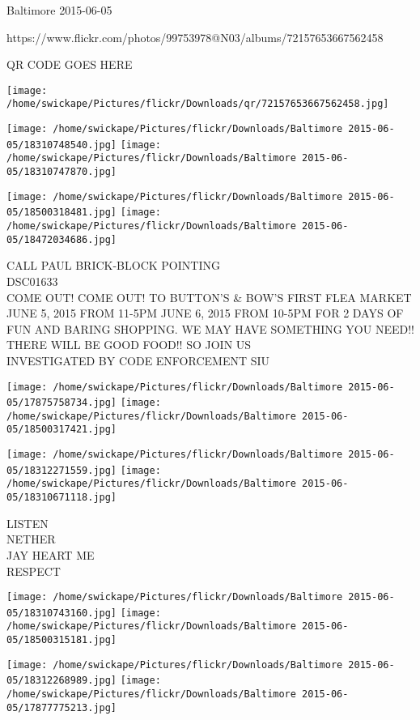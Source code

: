 \documentclass[10pt,letterpaper]{article}
\begin{document}
Baltimore 2015-06-05

https://www.flickr.com/photos/99753978@N03/albums/72157653667562458

QR CODE GOES HERE

\texttt{[image: /home/swickape/Pictures/flickr/Downloads/qr/72157653667562458.jpg]}
\pagebreak

\texttt{[image: /home/swickape/Pictures/flickr/Downloads/Baltimore 2015-06-05/18310748540.jpg]}
\texttt{[image: /home/swickape/Pictures/flickr/Downloads/Baltimore 2015-06-05/18310747870.jpg]}

\texttt{[image: /home/swickape/Pictures/flickr/Downloads/Baltimore 2015-06-05/18500318481.jpg]}
\texttt{[image: /home/swickape/Pictures/flickr/Downloads/Baltimore 2015-06-05/18472034686.jpg]}

CALL PAUL BRICK{-}BLOCK POINTING\\
DSC01633\\
COME OUT!  COME OUT!  TO BUTTON'S \& BOW'S FIRST FLEA MARKET JUNE 5, 2015 FROM 11{-}5PM JUNE 6, 2015 FROM 10{-}5PM FOR 2 DAYS OF FUN AND BARING SHOPPING.  WE MAY HAVE SOMETHING YOU NEED!! THERE WILL BE GOOD FOOD!! SO JOIN US\\
INVESTIGATED BY CODE ENFORCEMENT SIU\\
\pagebreak

\texttt{[image: /home/swickape/Pictures/flickr/Downloads/Baltimore 2015-06-05/17875758734.jpg]}
\texttt{[image: /home/swickape/Pictures/flickr/Downloads/Baltimore 2015-06-05/18500317421.jpg]}

\texttt{[image: /home/swickape/Pictures/flickr/Downloads/Baltimore 2015-06-05/18312271559.jpg]}
\texttt{[image: /home/swickape/Pictures/flickr/Downloads/Baltimore 2015-06-05/18310671118.jpg]}

LISTEN\\
NETHER\\
JAY HEART ME\\
RESPECT\\
\pagebreak

\texttt{[image: /home/swickape/Pictures/flickr/Downloads/Baltimore 2015-06-05/18310743160.jpg]}
\texttt{[image: /home/swickape/Pictures/flickr/Downloads/Baltimore 2015-06-05/18500315181.jpg]}

\texttt{[image: /home/swickape/Pictures/flickr/Downloads/Baltimore 2015-06-05/18312268989.jpg]}
\texttt{[image: /home/swickape/Pictures/flickr/Downloads/Baltimore 2015-06-05/17877775213.jpg]}
\end{document}
